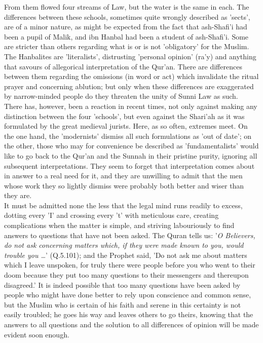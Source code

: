 \documentclass[10pt, twoside,openright]{book}
\begin{document}
From them flowed four streams of Law, but the water is the same in each. The differences between 
these schools, sometimes quite wrongly described as 'sects', are of a minor nature, as might be 
expected from the fact that ash\hyp{}Shafi'i had been a pupil of Malik, and ibn Hanbal had been a student 
of ash\hyp{}Shafi'i. Some are stricter than others regarding what is or is not 'obligatory' for the 
Muslim. The Hanbalites are 'literalists', distrusting 'personal opinion' (ra'y) and anything that 
savours of allegorical interpretation of the Qur'an. There are differences between them regarding the 
omissions (in word or act) which invalidate the ritual prayer and concerning ablution; but only when 
these differences are exaggerated by narrow\hyp{}minded people do they threaten the unity of Sunni Law as 
such. \\

There has, however, been a reaction in recent times, not only against making any distinction between 
the four 'schools', but even against the Shari'ah as it was formulated by the great medieval jurists. 
Here, as so often, extremes meet. On the one hand, the 'modernists' dismiss all such formulations as 
'out of date'; on the other, those who may for convenience be described as 'fundamentalists' would 
like to go back to the Qur'an and the Sunnah in their pristine purity, ignoring all subsequent 
interpretations. They seem to forget that interpretation comes about in answer to a real need for it, 
and they are unwilling to admit that the men whose work they so lightly dismiss were probably both 
better and wiser than they are. \\

It must be admitted none the less that the legal mind runs readily to excess, dotting every 'I' and 
crossing every 't' with meticulous care, creating complications when the matter is simple, and 
striving labouriously to find answers to questions that have not been asked. The Quran tells us: '\emph{O Believers, do not ask concerning matters which, if they were made known to you, would trouble you 
\ldots{}}' (Q.5.101); and the Prophet said, 'Do not ask me about matters which I leave unspoken, for truly 
there were people before you who went to their doom because they put too many questions to their 
messengers and thereupon disagreed.' It is indeed possible that too many questions have been asked by 
people who might have done better to rely upon conscience and common sense, but the Muslim who is 
certain of his faith and serene in this certainty is not easily troubled; he goes his way and leaves 
others to go theirs, knowing that the answers to all questions and the solution to all differences of 
opinion will be made evident soon enough. \\
\end{document}
